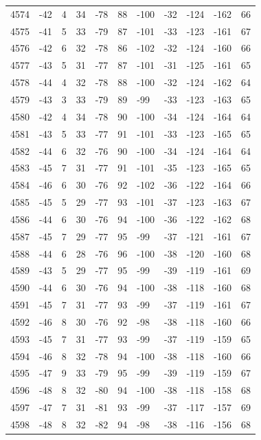 \begin{table}[H]
\begin{tabular}{lllllllllll}
4574 & -42 & 4 & 34 & -78 & 88 & -100 & -32 & -124 & -162 & 66 \\
4575 & -41 & 5 & 33 & -79 & 87 & -101 & -33 & -123 & -161 & 67 \\
4576 & -42 & 6 & 32 & -78 & 86 & -102 & -32 & -124 & -160 & 66 \\
4577 & -43 & 5 & 31 & -77 & 87 & -101 & -31 & -125 & -161 & 65 \\
4578 & -44 & 4 & 32 & -78 & 88 & -100 & -32 & -124 & -162 & 64 \\
4579 & -43 & 3 & 33 & -79 & 89 & -99 & -33 & -123 & -163 & 65 \\
4580 & -42 & 4 & 34 & -78 & 90 & -100 & -34 & -124 & -164 & 64 \\
4581 & -43 & 5 & 33 & -77 & 91 & -101 & -33 & -123 & -165 & 65 \\
4582 & -44 & 6 & 32 & -76 & 90 & -100 & -34 & -124 & -164 & 64 \\
4583 & -45 & 7 & 31 & -77 & 91 & -101 & -35 & -123 & -165 & 65 \\
4584 & -46 & 6 & 30 & -76 & 92 & -102 & -36 & -122 & -164 & 66 \\
4585 & -45 & 5 & 29 & -77 & 93 & -101 & -37 & -123 & -163 & 67 \\
4586 & -44 & 6 & 30 & -76 & 94 & -100 & -36 & -122 & -162 & 68 \\
4587 & -45 & 7 & 29 & -77 & 95 & -99 & -37 & -121 & -161 & 67 \\
4588 & -44 & 6 & 28 & -76 & 96 & -100 & -38 & -120 & -160 & 68 \\
4589 & -43 & 5 & 29 & -77 & 95 & -99 & -39 & -119 & -161 & 69 \\
4590 & -44 & 6 & 30 & -76 & 94 & -100 & -38 & -118 & -160 & 68 \\
4591 & -45 & 7 & 31 & -77 & 93 & -99 & -37 & -119 & -161 & 67 \\
4592 & -46 & 8 & 30 & -76 & 92 & -98 & -38 & -118 & -160 & 66 \\
4593 & -45 & 7 & 31 & -77 & 93 & -99 & -37 & -119 & -159 & 65 \\
4594 & -46 & 8 & 32 & -78 & 94 & -100 & -38 & -118 & -160 & 66 \\
4595 & -47 & 9 & 33 & -79 & 95 & -99 & -39 & -119 & -159 & 67 \\
4596 & -48 & 8 & 32 & -80 & 94 & -100 & -38 & -118 & -158 & 68 \\
4597 & -47 & 7 & 31 & -81 & 93 & -99 & -37 & -117 & -157 & 69 \\
4598 & -48 & 8 & 32 & -82 & 94 & -98 & -38 & -116 & -156 & 68 \\

\end{tabular}
\end{table}
